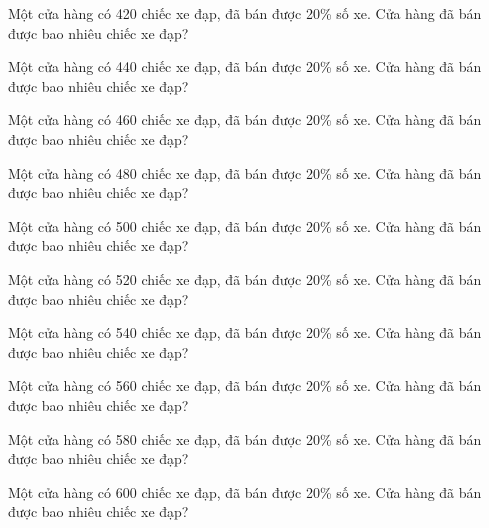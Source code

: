 \begin{ex}
  Một cửa hàng có 420 chiếc xe đạp, đã bán được 20\% số xe. Cửa hàng đã bán được bao nhiêu chiếc xe đạp?
\end{ex}

\begin{ex}
  Một cửa hàng có 440 chiếc xe đạp, đã bán được 20\% số xe. Cửa hàng đã bán được bao nhiêu chiếc xe đạp?
\end{ex}

\begin{ex}
  Một cửa hàng có 460 chiếc xe đạp, đã bán được 20\% số xe. Cửa hàng đã bán được bao nhiêu chiếc xe đạp?
\end{ex}

\begin{ex}
  Một cửa hàng có 480 chiếc xe đạp, đã bán được 20\% số xe. Cửa hàng đã bán được bao nhiêu chiếc xe đạp?
\end{ex}

\begin{ex}
  Một cửa hàng có 500 chiếc xe đạp, đã bán được 20\% số xe. Cửa hàng đã bán được bao nhiêu chiếc xe đạp?
\end{ex}

\begin{ex}
  Một cửa hàng có 520 chiếc xe đạp, đã bán được 20\% số xe. Cửa hàng đã bán được bao nhiêu chiếc xe đạp?
\end{ex}

\begin{ex}
  Một cửa hàng có 540 chiếc xe đạp, đã bán được 20\% số xe. Cửa hàng đã bán được bao nhiêu chiếc xe đạp?
\end{ex}

\begin{ex}
  Một cửa hàng có 560 chiếc xe đạp, đã bán được 20\% số xe. Cửa hàng đã bán được bao nhiêu chiếc xe đạp?
\end{ex}

\begin{ex}
  Một cửa hàng có 580 chiếc xe đạp, đã bán được 20\% số xe. Cửa hàng đã bán được bao nhiêu chiếc xe đạp?
\end{ex}

\begin{ex}
  Một cửa hàng có 600 chiếc xe đạp, đã bán được 20\% số xe. Cửa hàng đã bán được bao nhiêu chiếc xe đạp?
\end{ex}
